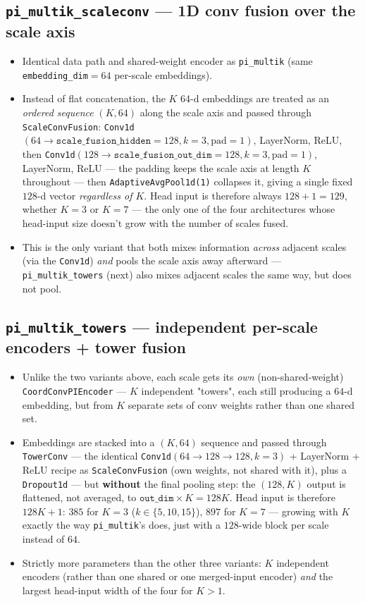 \documentclass[11pt]{article}
\begin{document}
\subsection{\texttt{pi\_multik\_scaleconv} --- 1D conv fusion over the scale axis}
\begin{itemize}
  \item Identical data path and shared-weight encoder as \texttt{pi\_multik}
    (same \texttt{embedding\_dim}$=64$ per-scale embeddings).
  \item Instead of flat concatenation, the $K$ 64-d embeddings are treated as
    an \emph{ordered sequence} $(K, 64)$ along the scale axis and passed
    through \texttt{ScaleConvFusion}: \texttt{Conv1d}$(64\to\texttt{scale\_fusion\_hidden}{=}128,
    k{=}3,\text{pad}{=}1)$, LayerNorm, ReLU, then
    \texttt{Conv1d}$(128\to\texttt{scale\_fusion\_out\_dim}{=}128, k{=}3,\text{pad}{=}1)$,
    LayerNorm, ReLU — the padding keeps the scale axis at length $K$ throughout —
    then \texttt{AdaptiveAvgPool1d(1)} collapses it, giving a single fixed
    $128$-d vector \emph{regardless of $K$}. Head input is therefore always
    $128+1=129$, whether $K=3$ or $K=7$ — the only one of the four architectures
    whose head-input size doesn't grow with the number of scales fused.
  \item This is the only variant that both mixes information \emph{across}
    adjacent scales (via the \texttt{Conv1d}) \emph{and} pools the scale axis
    away afterward — \texttt{pi\_multik\_towers} (next) also mixes adjacent
    scales the same way, but does not pool.
\end{itemize}

\subsection{\texttt{pi\_multik\_towers} --- independent per-scale encoders + tower fusion}
\begin{itemize}
  \item Unlike the two variants above, each scale gets its \emph{own}
    (non-shared-weight) \texttt{CoordConvPIEncoder} — $K$ independent "towers",
    each still producing a $64$-d embedding, but from $K$ separate sets of
    conv weights rather than one shared set.
  \item Embeddings are stacked into a $(K, 64)$ sequence and passed through
    \texttt{TowerConv} — the identical \texttt{Conv1d}$(64\to128\to128, k{=}3)$
    + LayerNorm + ReLU recipe as \texttt{ScaleConvFusion} (own weights, not
    shared with it), plus a \texttt{Dropout1d} — but \textbf{without} the final
    pooling step: the $(128, K)$ output is flattened, not averaged, to
    $\texttt{out\_dim}\times K = 128K$. Head input is therefore $128K+1$: $385$
    for $K=3$ ($k\in\{5,10,15\}$), $897$ for $K=7$ — growing with $K$ exactly
    the way \texttt{pi\_multik}'s does, just with a $128$-wide block per scale
    instead of $64$.
  \item Strictly more parameters than the other three variants: $K$ independent
    encoders (rather than one shared or one merged-input encoder) \emph{and}
    the largest head-input width of the four for $K>1$.
\end{itemize}
\end{document}
